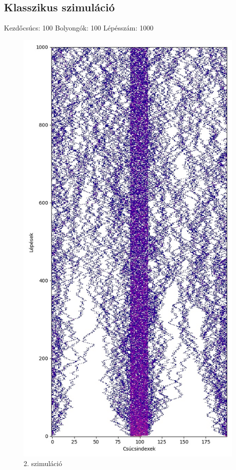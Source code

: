 \documentclass[14pt,a4paper]{article}
\begin{document}
\subsection{Klasszikus szimuláció}
Kezdőcsúcs: 100
Bolyongók: 100
Lépésszám: 1000
\begin{figure}[H]
\centering
\includegraphics[width = 0.7\columnwidth]{sim02.jpg}
\caption{2. szimuláció}
\end{figure}
\end{document}
